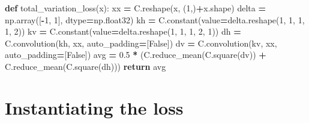 \documentclass[]{book}
\newenvironment{Shaded}{\begin{snugshade}}{\end{snugshade}}
\newcommand{\KeywordTok}[1]{\textcolor[rgb]{0.13,0.29,0.53}{\textbf{#1}}}
\newcommand{\DecValTok}[1]{\textcolor[rgb]{0.00,0.00,0.81}{#1}}
\newcommand{\FloatTok}[1]{\textcolor[rgb]{0.00,0.00,0.81}{#1}}
\newcommand{\VariableTok}[1]{\textcolor[rgb]{0.00,0.00,0.00}{#1}}
\newcommand{\ControlFlowTok}[1]{\textcolor[rgb]{0.13,0.29,0.53}{\textbf{#1}}}
\newcommand{\OperatorTok}[1]{\textcolor[rgb]{0.81,0.36,0.00}{\textbf{#1}}}
\newcommand{\NormalTok}[1]{#1}
\theoremstyle{definition}
\theoremstyle{definition}
\theoremstyle{definition}
\theoremstyle{remark}
\begin{document}
\begin{Shaded}
\begin{Highlighting}[]
\KeywordTok{def}\NormalTok{ total_variation_loss(x):}
\NormalTok{    xx }\OperatorTok{=}\NormalTok{ C.reshape(x, (}\DecValTok{1}\NormalTok{,)}\OperatorTok{+}\NormalTok{x.shape)}
\NormalTok{    delta }\OperatorTok{=}\NormalTok{ np.array([}\OperatorTok{-}\DecValTok{1}\NormalTok{, }\DecValTok{1}\NormalTok{], dtype}\OperatorTok{=}\NormalTok{np.float32)}
\NormalTok{    kh }\OperatorTok{=}\NormalTok{ C.constant(value}\OperatorTok{=}\NormalTok{delta.reshape(}\DecValTok{1}\NormalTok{, }\DecValTok{1}\NormalTok{, }\DecValTok{1}\NormalTok{, }\DecValTok{1}\NormalTok{, }\DecValTok{2}\NormalTok{))}
\NormalTok{    kv }\OperatorTok{=}\NormalTok{ C.constant(value}\OperatorTok{=}\NormalTok{delta.reshape(}\DecValTok{1}\NormalTok{, }\DecValTok{1}\NormalTok{, }\DecValTok{1}\NormalTok{, }\DecValTok{2}\NormalTok{, }\DecValTok{1}\NormalTok{))}
\NormalTok{    dh }\OperatorTok{=}\NormalTok{ C.convolution(kh, xx, auto_padding}\OperatorTok{=}\NormalTok{[}\VariableTok{False}\NormalTok{])}
\NormalTok{    dv }\OperatorTok{=}\NormalTok{ C.convolution(kv, xx, auto_padding}\OperatorTok{=}\NormalTok{[}\VariableTok{False}\NormalTok{])}
\NormalTok{    avg }\OperatorTok{=} \FloatTok{0.5} \OperatorTok{*}\NormalTok{ (C.reduce_mean(C.square(dv)) }\OperatorTok{+}\NormalTok{ C.reduce_mean(C.square(dh)))}
    \ControlFlowTok{return}\NormalTok{ avg}
\end{Highlighting}
\end{Shaded}

\section{Instantiating the loss}\label{instantiating-the-loss}
\end{document}

